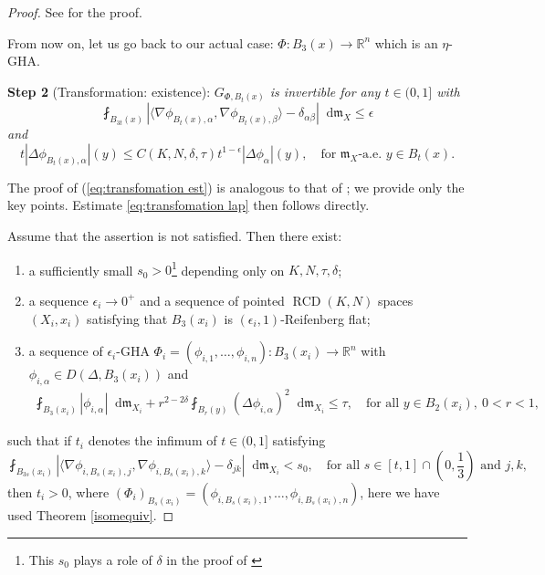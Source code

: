 \documentclass[11pt,reqno]{amsart}
\theoremstyle{definition}
\numberwithin{equation}{section}
\newcommand{\di}{\mathop{}\!\mathrm{d}}
\newcommand{\meas}{\mathfrak{m}}
\DeclareMathOperator{\RCD}{RCD}
\begin{document}
\begin{proof}
\smallskip

See \cite[Corollary 3.6]{HP} for the proof.

\smallskip

From now on, let us go back to our actual case: $\Phi:B_3(x) \to \mathbb{R}^n$ which is an $\eta$-GHA.

\smallskip

\textbf{Step 2} (Transformation: existence): \textit{$G_{\Phi, B_t(x)}$ is invertible for any $t \in (0, 1]$ with
 \begin{equation}\label{eq:transfomation est}
        \fint_{B_{3t}(x)}\left|\langle \nabla \phi_{B_t(x), \alpha}, \nabla \phi_{B_t(x), \beta}\rangle -\delta_{\alpha \beta}\right| \di \meas_X \le \epsilon
    \end{equation}
 and
 \begin{equation}\label{eq:transfomation lap}
        t|\Delta \phi_{B_t(x), \alpha}|(y)\le C(K, N, \delta, \tau)t^{1-\epsilon}|\Delta \phi_{\alpha}|(y),\quad \text{for $\meas_X$-a.e. $y \in B_{t}(x)$}.
    \end{equation}
}

\smallskip

The proof of (\ref{eq:transfomation est}) is  analogous to that of \cite[Proposition 3.7]{HP}; we provide only the key points. Estimate   \eqref{eq:transfomation lap} then follows directly.

Assume that the assertion is not satisfied. Then there exist:
\begin{enumerate}
\item a sufficiently small $s_0>0$\footnote{This $s_0$ plays a role of $\delta$ in the proof of \cite[Proposition 3.7]{HP}} depending only on $K, N, \tau, \delta$;
    \item a sequence $\epsilon_i \to 0^+$ and a sequence of pointed $\RCD(K, N)$ spaces $(X_i, x_i)$ satisfying that $B_3(x_i)$ is $(\epsilon_i, 1)$-Reifenberg flat;
    \item a sequence of $\epsilon_i$-GHA $\Phi_i=(\phi_{i, 1}, \ldots, \phi_{i, n}):B_3(x_i) \to \mathbb{R}^n$ with $\phi_{i, \alpha} \in D(\Delta, B_3(x_i))$ and 
    \begin{align}
        \fint_{B_3(x_i)}|\phi_{i, \alpha}|\di \meas_{X_i}+r^{2-2 \delta}\fint_{B_r(y)}(\Delta \phi_{i, \alpha})^2\di \meas_{X_i} \le \tau,\quad \text{for all $y \in B_2(x_i), \ 0<r<1$},
    \end{align}
\end{enumerate}
such that if $t_i$ denotes the infimum of $t \in (0, 1]$ satisfying
\begin{equation}\label{soassossisisihrbrb}
    \fint_{B_{3s}(x_i)}\left| \langle \nabla \phi_{i, B_{s}(x_i), j}, \nabla \phi_{i, B_{s}(x_i), k}\rangle -\delta_{jk}\right|\di \meas_{X_i}<s_0, \quad \text{for all $s \in [t, 1] \cap \left(0, \frac{1}{3}\right)$ and $j, k$,}
\end{equation}
then $t_i>0$, where $(\Phi_i)_{B_s(x_i)}=(\phi_{i, B_{s}(x_i), 1}, \ldots, \phi_{i, B_{s}(x_i), n})$, here we have used Theorem \ref{isomequiv}.



\end{proof}
\end{document}
